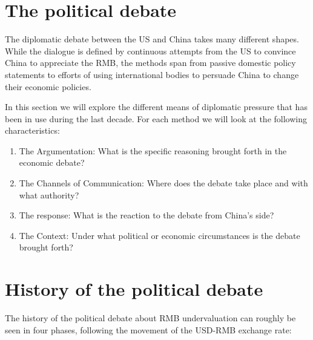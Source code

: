
\section{The political debate}

The diplomatic debate between the US and China takes many different 
shapes. While the dialogue is defined by continuous attempts from the US 
to convince China to appreciate the RMB, the methods span from passive 
domestic policy statements to efforts of using international bodies to 
persuade China to change their economic policies.

In this section we will explore the different means of diplomatic 
pressure that has been in use during the last decade. For each method we 
will look at the following characteristics:

\begin{enumerate}
	\item{The Argumentation: What is the specific reasoning brought 
		forth in the economic debate?}
	\item{The Channels of Communication: Where does the debate take 
		place and with what authority?}
	\item{The response: What is the reaction to the debate from China's 
		side?}
	\item{The Context: Under what political or economic circumstances is 
		the debate brought forth?}
\end{enumerate}


\section{History of the political debate}

The history of the political debate about RMB undervaluation can roughly be seen in four phases, following the movement of the USD-RMB exchange rate:


